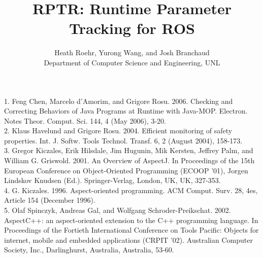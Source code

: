 \documentclass[acmtocl,acmnow]{acmtrans2m}
\title{RPTR: Runtime Parameter Tracking for ROS}
\author{Heath Roehr, Yurong Wang, and Josh Branchaud\\
Department of Computer Science and Engineering, UNL}
\begin{document}
            
\begin{bottomstuff} 

\end{bottomstuff}
            
\maketitle







\begin{thebibliography}{1.}

	1. Feng Chen, Marcelo d'Amorim, and Grigore Rosu. 2006. Checking and Correcting Behaviors of Java Programs at Runtime with Java-MOP. Electron. Notes Theor. Comput. Sci. 144, 4 (May 2006), 3-20.\\
	
	2. Klaus Havelund and Grigore Rosu. 2004. Efficient monitoring of safety properties. Int. J. Softw. Tools Technol. Transf. 6, 2 (August 2004), 158-173.\\
	
	3. Gregor Kiczales, Erik Hilsdale, Jim Hugunin, Mik Kersten, Jeffrey Palm, and William G. Griswold. 2001. An Overview of AspectJ. In Proceedings of the 15th European Conference on Object-Oriented Programming (ECOOP '01), Jorgen Lindskov Knudsen (Ed.). Springer-Verlag, London, UK, UK, 327-353.\\
	
	4. G. Kiczales. 1996. Aspect-oriented programming. ACM Comput. Surv. 28, 4es, Article 154 (December 1996).\\
	
	5. Olaf Spinczyk, Andreas Gal, and Wolfgang Schroder-Preikschat. 2002. AspectC++: an aspect-oriented extension to the C++ programming language. In Proceedings of the Fortieth International Conference on Tools Pacific: Objects for internet, mobile and embedded applications (CRPIT '02). Australian Computer Society, Inc., Darlinghurst, Australia, Australia, 53-60.\\

\end{thebibliography}

\begin{received}

\end{received}
\end{document}
